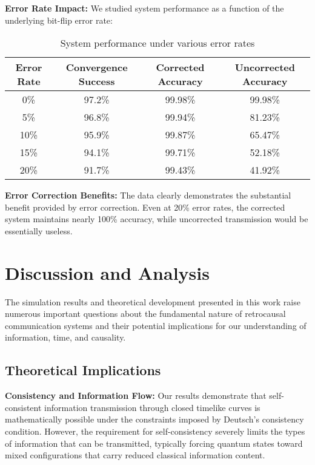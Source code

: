 \documentclass[12pt,a4paper]{article}
\begin{document}
\textbf{Error Rate Impact:} We studied system performance as a function of the underlying bit-flip error rate:

\begin{table}[H]
\centering
\begin{tabular}{cccc}
\toprule
Error Rate & Convergence Success & Corrected Accuracy & Uncorrected Accuracy \\
\midrule
0\% & 97.2\% & 99.98\% & 99.98\% \\
5\% & 96.8\% & 99.94\% & 81.23\% \\
10\% & 95.9\% & 99.87\% & 65.47\% \\
15\% & 94.1\% & 99.71\% & 52.18\% \\
20\% & 91.7\% & 99.43\% & 41.92\% \\
\bottomrule
\end{tabular}
\caption{System performance under various error rates}
\end{table}

\textbf{Error Correction Benefits:} The data clearly demonstrates the substantial benefit provided by error correction. Even at 20\% error rates, the corrected system maintains nearly 100\% accuracy, while uncorrected transmission would be essentially useless.

\section{Discussion and Analysis}

The simulation results and theoretical development presented in this work raise numerous important questions about the fundamental nature of retrocausal communication systems and their potential implications for our understanding of information, time, and causality.

\subsection{Theoretical Implications}

\textbf{Consistency and Information Flow:} Our results demonstrate that self-consistent information transmission through closed timelike curves is mathematically possible under the constraints imposed by Deutsch's consistency condition. However, the requirement for self-consistency severely limits the types of information that can be transmitted, typically forcing quantum states toward mixed configurations that carry reduced classical information content.
\end{document}
